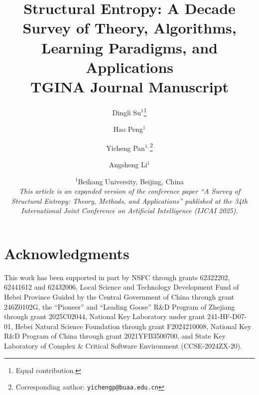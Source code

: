\documentclass[12pt,a4paper]{article}
\title{%
  Structural Entropy: A Decade Survey of Theory, Algorithms,\\
  Learning Paradigms, and Applications\\
  \large TGINA Journal Manuscript
}
\author{%
  Dingli Su$^{1}$\thanks{Equal contribution.}
  \and
  Hao Peng$^{1}$
  \and
  Yicheng Pan$^{1,}$\thanks{Corresponding author: \texttt{yichengp@buaa.edu.cn}}
  \and
  Angsheng Li$^{1}$
}
\date{%
  $^1$Beihang University, Beijing, China\\[4pt]
  \small
  \emph{This article is an expanded version of the conference paper
  ``A Survey of Structural Entropy: Theory, Methods, and Applications''
  published at the 34th International Joint Conference on
  Artificial Intelligence (IJCAI 2025).}
}
\begin{document}
\maketitle
\thispagestyle{plain}












\section*{Acknowledgments}
This work has been supported in part by NSFC through grants 62322202, 62441612
and 62432006, Local Science and Technology Development Fund of Hebei Province
Guided by the Central Government of China through grant 246Z0102G, the
``Pioneer'' and ``Leading Goose'' R\&D Program of Zhejiang through grant
2025C02044, National Key Laboratory under grant 241-HF-D07-01, Hebei Natural
Science Foundation through grant F2024210008, National Key R\&D Program of China
through grant 2021YFB3500700, and State Key Laboratory of Complex \& Critical
Software Environment (CCSE-2024ZX-20).




\appendix

\end{document}
